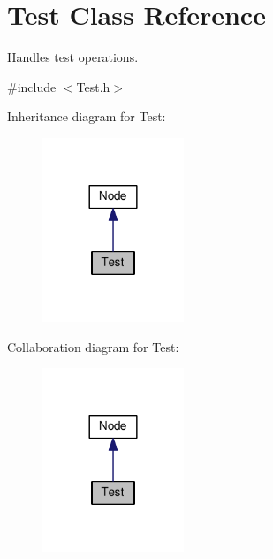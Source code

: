 \hypertarget{classTest}{}\section{Test Class Reference}
\label{classTest}


Handles test operations.  




{\ttfamily \#include $<$Test.\+h$>$}



Inheritance diagram for Test\+:\nopagebreak
\begin{figure}[H]
\begin{center}
\leavevmode
\includegraphics[width=120pt]{classTest__inherit__graph}
\end{center}
\end{figure}


Collaboration diagram for Test\+:\nopagebreak
\begin{figure}[H]
\begin{center}
\leavevmode
\includegraphics[width=120pt]{classTest__coll__graph}
\end{center}
\end{figure}

